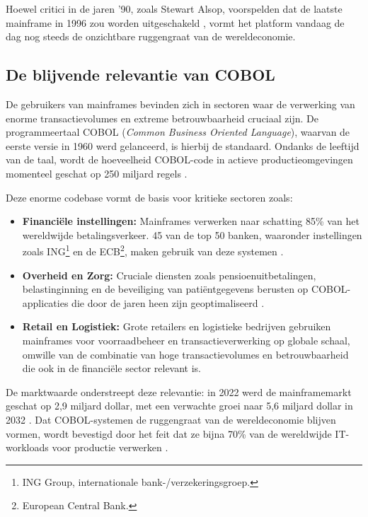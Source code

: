 Hoewel critici in de jaren '90, zoals Stewart Alsop, voorspelden dat de laatste mainframe in 1996 zou worden uitgeschakeld \autocite{Alsop1991}, vormt het platform vandaag de dag nog steeds de onzichtbare ruggengraat van de wereldeconomie.

\subsection{De blijvende relevantie van COBOL}

De gebruikers van mainframes bevinden zich in sectoren waar de verwerking van enorme transactievolumes en extreme betrouwbaarheid cruciaal zijn. 
De programmeertaal COBOL (\textit{Common Business Oriented Language}), waarvan de eerste versie in 1960 werd gelanceerd, is hierbij de standaard. 
Ondanks de leeftijd van de taal, wordt de hoeveelheid COBOL-code in actieve productieomgevingen momenteel geschat op 250 miljard regels \autocite{IBM2025}.

Deze enorme codebase vormt de basis voor kritieke sectoren zoals:
\begin{itemize}
      \item \textbf{Financiële instellingen:} Mainframes verwerken naar schatting 85\% van het wereldwijde betalingsverkeer. 45 van de top 50 banken, waaronder instellingen zoals ING\footnote{ING Group, internationale bank-/verzekeringsgroep.} en de ECB\footnote{European Central Bank.}, maken gebruik van deze systemen \autocite{IBM2022a}.
      \item \textbf{Overheid en Zorg:} Cruciale diensten zoals pensioenuitbetalingen, belastinginning en de beveiliging van patiëntgegevens berusten op COBOL-applicaties die door de jaren heen zijn geoptimaliseerd \autocite{IBM2022}.
      \item \textbf{Retail en Logistiek:} Grote retailers en logistieke bedrijven gebruiken mainframes voor voorraadbeheer en transactieverwerking op globale schaal, omwille van de combinatie van hoge transactievolumes en betrouwbaarheid die ook in de financiële sector relevant is.
\end{itemize}

De marktwaarde onderstreept deze relevantie: in 2022 werd de mainframemarkt geschat op 2,9 miljard dollar, met een verwachte groei naar 5,6 miljard dollar in 2032 \autocite{Allied2022}. 
Dat COBOL-systemen de ruggengraat van de wereldeconomie blijven vormen, wordt bevestigd door het feit dat ze bijna 70\% van de wereldwijde IT-workloads voor productie verwerken \autocite{Granger2021}.


